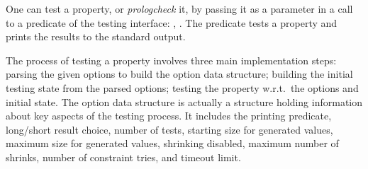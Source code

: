 One can test a property, or \emph{prologcheck} it,  by passing it as a parameter in a
call to a predicate of the \plqc{} testing interface: ,
 .
%
The  predicate tests a property and prints the results
to the standard output.
%
%
%
%
%
%


The process of testing a property 
involves three main implementation steps: parsing the given options to build the option data
structure; building the initial testing state from the parsed options; testing the
property w.r.t.\ the  options and initial state.
%
The option data structure is actually a structure holding information
about key aspects of the testing process.
%
It includes the printing predicate, long/short result choice, number of
tests, starting size for generated values, maximum size for generated
values, shrinking disabled, maximum number of shrinks, number
of constraint tries, and timeout limit.

